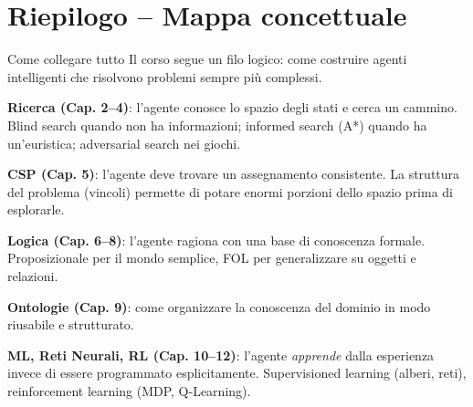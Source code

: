 \documentclass[12pt,a4paper]{article}
\begin{document}
\section{Riepilogo -- Mappa concettuale}

\begin{narrativo}{Come collegare tutto}
Il corso segue un filo logico: come costruire agenti intelligenti che risolvono problemi sempre più complessi.

\textbf{Ricerca (Cap. 2--4)}: l'agente conosce lo spazio degli stati e cerca un cammino. Blind search quando non ha informazioni; informed search (A*) quando ha un'euristica; adversarial search nei giochi.

\textbf{CSP (Cap. 5)}: l'agente deve trovare un assegnamento consistente. La struttura del problema (vincoli) permette di potare enormi porzioni dello spazio prima di esplorarle.

\textbf{Logica (Cap. 6--8)}: l'agente ragiona con una base di conoscenza formale. Proposizionale per il mondo semplice, FOL per generalizzare su oggetti e relazioni.

\textbf{Ontologie (Cap. 9)}: come organizzare la conoscenza del dominio in modo riusabile e strutturato.

\textbf{ML, Reti Neurali, RL (Cap. 10--12)}: l'agente \emph{apprende} dalla esperienza invece di essere programmato esplicitamente. Supervisioned learning (alberi, reti), reinforcement learning (MDP, Q-Learning).
\end{narrativo}
\end{document}
